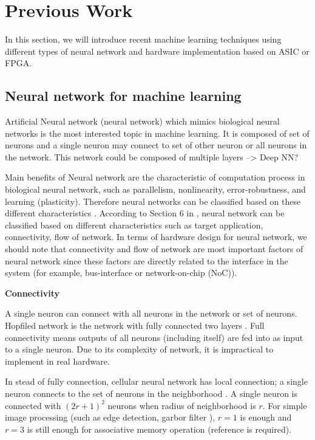 \documentclass[pageno]{jpaper}
\begin{document}
\section{Previous Work}\label{sec:Previous works}
In this section, we will introduce recent machine learning techniques using different types of neural network and hardware implementation based on ASIC or FPGA. 

\subsection{Neural network for machine learning} \label{sub_sec:Previous works algorithm}
Artificial Neural network (neural network) which mimics biological neural networks is the most interested topic in machine learning. It is composed of set of neurons and a single neuron may connect to set of other neuron or all neurons in the network. This network could be composed of multiple layers --> Deep NN?

Main benefits of Neural network are the characteristic of computation process in biological neural network, such as parallelism, nonlinearity, error-robustness, and learning (plasticity). Therefore neural networks can be classified based on these different characteristics \cite{basheer2000artificial}. According to Section 6 in \cite{basheer2000artificial}, neural network can be classified based on different characteristics such as target application, connectivity, flow of network. In terms of hardware design for neural network, we should note that connectivity and flow of network are most important factors of neural network since these factors are directly related to the interface in the system (for example, bus-interface or network-on-chip (NoC)). 

\textbf{Connectivity}

A single neuron can connect with all neurons in the network or set of neurons. Hopfiled network is the network with fully connected two layers \cite{hopfield1984neurons}. Full connectivity means outputs of all neurons (including itself) are fed into as input to a single neuron. Due to its complexity of network, it is impractical to implement in real hardware. 

In stead of fully connection, cellular neural network has local connection; a single neuron connects to the set of neurons in the neighborhood \cite{chua1988cellular}. A single neuron is connected with \begin{math} (2r+1)^2 \end{math} neurons when radius of neighborhood is \begin{math}r\end{math}. For simple image processing (such as edge detection\cite{chua2002cellular}, garbor filter \cite{egmont2002image}), \begin{math} r=1\end{math} is enough and \begin{math} r=3\end{math} is still enough for associative memory operation (reference is required).
\end{document}
